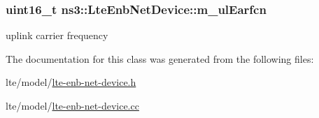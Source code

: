 \subsubsection[{\texorpdfstring{m\+\_\+ul\+Earfcn}{m_ulEarfcn}}]{\setlength{\rightskip}{0pt plus 5cm}uint16\+\_\+t ns3\+::\+Lte\+Enb\+Net\+Device\+::m\+\_\+ul\+Earfcn\hspace{0.3cm}{\ttfamily [private]}}\hypertarget{classns3_1_1LteEnbNetDevice_a0760bf2c3e1199b2196c01d99d7221b7}{}\label{classns3_1_1LteEnbNetDevice_a0760bf2c3e1199b2196c01d99d7221b7}
uplink carrier frequency 

The documentation for this class was generated from the following files\+:\begin{DoxyCompactItemize}
\item 
lte/model/\hyperlink{lte-enb-net-device_8h}{lte-\/enb-\/net-\/device.\+h}\item 
lte/model/\hyperlink{lte-enb-net-device_8cc}{lte-\/enb-\/net-\/device.\+cc}\end{DoxyCompactItemize}
